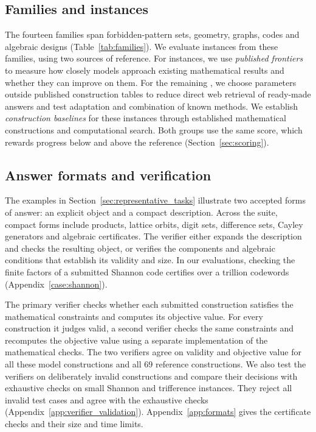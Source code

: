 \documentclass{article}
\begin{document}
\subsection{Families and instances}
\label{sec:tiers}
The fourteen families span forbidden-pattern sets, geometry, graphs, codes and algebraic designs (Table~\ref{tab:families}). We evaluate \DistinctN{} instances from these families, using two sources of reference. For \PanelOneN{} instances, we use \emph{published frontiers} to measure how closely models approach existing mathematical results and whether they can improve on them. For the remaining \PanelTwoN{}, we choose parameters outside published construction tables to reduce direct web retrieval of ready-made answers and test adaptation and combination of known methods. We establish \emph{construction baselines} for these instances through established mathematical constructions and computational search. Both groups use the same score, which rewards progress below and above the reference (Section~\ref{sec:scoring}).



\subsection{Answer formats and verification}
\label{sec:formats}
The examples in Section~\ref{sec:representative_tasks} illustrate two accepted forms of answer: an explicit object and a compact description. Across the suite, compact forms include products, lattice orbits, digit sets, difference sets, Cayley generators and algebraic certificates. The verifier either expands the description and checks the resulting object, or verifies the components and algebraic conditions that establish its validity and size. In our evaluations, checking the finite factors of a submitted Shannon code certifies over a trillion codewords (Appendix~\ref{case:shannon}).

The primary verifier checks whether each submitted construction satisfies the mathematical constraints and computes its objective value. For every construction it judges valid, a second verifier checks the same constraints and recomputes the objective value using a separate implementation of the mathematical checks. The two verifiers agree on validity and objective value for all these model constructions and all 69 reference constructions. We also test the verifiers on deliberately invalid constructions and compare their decisions with exhaustive checks on small Shannon and trifference instances. They reject all invalid test cases and agree with the exhaustive checks (Appendix~\ref{app:verifier_validation}). Appendix~\ref{app:formats} gives the certificate checks and their size and time limits.
\end{document}
